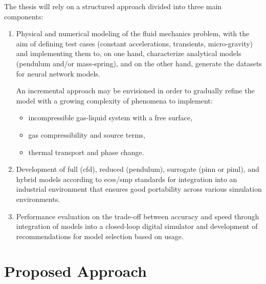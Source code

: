 \documentclass[12pt]{article}
\begin{document}
	The thesis will rely on a structured approach divided into three main components:
	\begin{enumerate}
		\item Physical and numerical modeling of the fluid mechanics problem, with the aim of defining test cases (constant accelerations, transients, micro-gravity) and implementing them to, on one hand, characterize analytical models (pendulum and/or mass-spring), and on the other hand, generate the datasets for neural network models.
		
		An incremental approach may be envisioned in order to gradually refine the model with a growing complexity of phenomena to implement:
		\begin{itemize}
			\item incompressible gas-liquid system with a free surface,
			\item gas compressibility and source terms,
			\item thermal transport and phase change.
		\end{itemize}
		
		\item Development of full (\acrshort{cfd}), reduced (pendulum), surrogate (\acrshort{pinn} or \acrshort{piml}), and hybrid models according to \acrshort{ecss}/\acrshort{smp} standards for integration into an industrial environment that ensures good portability across various simulation environments.
		
		\item Performance evaluation on the trade-off between accuracy and speed through integration of models into a closed-loop digital simulator and development of recommendations for model selection based on usage.
	\end{enumerate}
	
	\section*{Proposed Approach}
	
\end{document}

